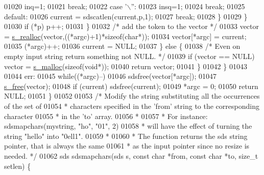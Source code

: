 \begin{DoxyCode}
{{{{{{{{{{{{{{{{01020                         inq=1;
01021                         \textcolor{keywordflow}{break};
01022                     \textcolor{keywordflow}{case} \textcolor{stringliteral}{'\(\backslash\)''}:
01023                         insq=1;
01024                         \textcolor{keywordflow}{break};
01025                     \textcolor{keywordflow}{default}:
01026                         current = sdscatlen(current,p,1);
01027                         \textcolor{keywordflow}{break};
01028                     \}
01029                 \}
01030                 \textcolor{keywordflow}{if} (*p) p++;
01031             \}
01032             \textcolor{comment}{/* add the token to the vector */}
01033             vector = \hyperlink{sdsalloc_8h_a86d1b352c4e2c2848948649747bd296a}{s\_realloc}(vector,((*argc)+1)*\textcolor{keyword}{sizeof}(\textcolor{keywordtype}{char}*));
01034             vector[*argc] = current;
01035             (*argc)++;
01036             current = NULL;
01037         \} \textcolor{keywordflow}{else} \{
01038             \textcolor{comment}{/* Even on empty input string return something not NULL. */}
01039             \textcolor{keywordflow}{if} (vector == NULL) vector = \hyperlink{sdsalloc_8h_a41e8c1188dca30db85c410c25fb417b6}{s\_malloc}(\textcolor{keyword}{sizeof}(\textcolor{keywordtype}{void}*));
01040             \textcolor{keywordflow}{return} vector;
01041         \}
01042     \}
01043 
01044 err:
01045     \textcolor{keywordflow}{while}((*argc)--)
01046         sdsfree(vector[*argc]);
01047     \hyperlink{sdsalloc_8h_aa06cb49194c292098a753d87e2ac6b71}{s\_free}(vector);
01048     \textcolor{keywordflow}{if} (current) sdsfree(current);
01049     *argc = 0;
01050     \textcolor{keywordflow}{return} NULL;
01051 \}
01052 
01053 \textcolor{comment}{/* Modify the string substituting all the occurrences of the set of}
01054 \textcolor{comment}{ * characters specified in the 'from' string to the corresponding character}
01055 \textcolor{comment}{ * in the 'to' array.}
01056 \textcolor{comment}{ *}
01057 \textcolor{comment}{ * For instance: sdsmapchars(mystring, "ho", "01", 2)}
01058 \textcolor{comment}{ * will have the effect of turning the string "hello" into "0ell1".}
01059 \textcolor{comment}{ *}
01060 \textcolor{comment}{ * The function returns the sds string pointer, that is always the same}
01061 \textcolor{comment}{ * as the input pointer since no resize is needed. */}
01062 sds sdsmapchars(sds s, \textcolor{keyword}{const} \textcolor{keywordtype}{char} *from, \textcolor{keyword}{const} \textcolor{keywordtype}{char} *to, size\_t setlen) \{
}}}}}}}}}}}}}}}}
\end{DoxyCode}

